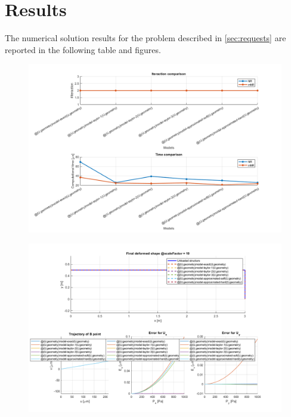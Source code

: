 \section{Results}

The numerical solution results for the problem described in \ref{sec:requests} are reported in the following table and figures.

\begin{figure}[H]
    \centering
    \label{tab:results}
\end{figure}

\begin{figure}[H]
    \centering
    \includegraphics[width=.9\textwidth]{../Results/correctors_methods_comparison}
    \label{fig:correctors_methods_comparison}
\end{figure}

\begin{figure}[H]
    \centering
    \includegraphics[width=.9\textwidth]{../Results/deformed_shape_analysis}
    \label{fig:deformed_shape_analysis}
\end{figure}